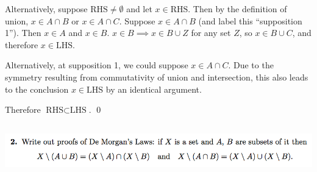 \documentclass[12pt]{article}
\newcommand{\LHS}{\text{LHS}}
\newcommand{\RHS}{\text{RHS}}
\begin{document}
\begin{mdframed}
Alternatively, suppose $\RHS \neq \emptyset$ and let $x \in \RHS$. Then by the
definition of union, $x \in A \cap B$ or $x \in A \cap C$. Suppose
$x \in A \cap B$ (and label this ``supposition 1''). Then $x \in A$ and
$x \in B$. $x \in B \implies x \in B \cup Z$ for any set $Z$, so
$x \in B \cup C$, and therefore $x \in \LHS$.

Alternatively, at supposition 1, we could suppose $x \in A \cap C$. Due to
the symmetry resulting from commutativity of union and intersection, this also
leads to the conclusion $x \in \LHS$ by an identical argument.

Therefore $\RHS \subset \LHS$. \qed
\end{mdframed}


\subsection*{} %
\includegraphics[width=400pt]{img/iulm-1-2.png}
\begin{mdframed}
\end{mdframed}

\newpage
\end{document}
